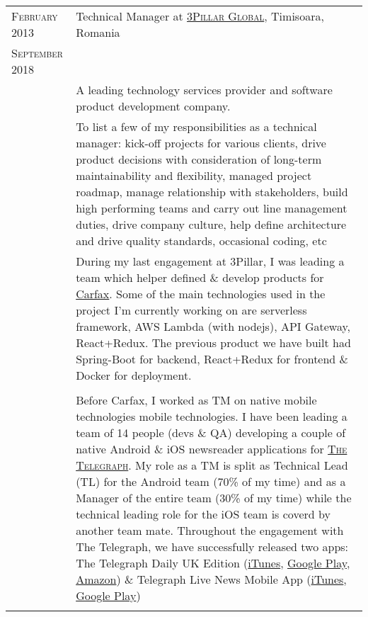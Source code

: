 \documentclass[a4paper,10pt]{article}
\begin{document}
\begin{longtable}{p{2.5cm}|p{11cm}}
 \raggedleft \textsc{February 2013} & Technical Manager at
 \textsc{\href{http://www.3pillarglobal.com/}{3Pillar Global}}, Timisoara, Romania
 \\\raggedleft \textsc{September 2018}\\ 
& \footnotesize{A leading technology services provider and software product development company.}\\
& \footnotesize{To list a few of my responsibilities as a technical manager: kick-off projects for various clients, drive product decisions with consideration of long-term maintainability and flexibility, managed project roadmap, manage relationship with stakeholders, build high performing teams and carry out line management duties, drive company culture, help define architecture and drive quality standards, occasional coding, etc}\\
& \footnotesize{During my last engagement at 3Pillar, I was leading a team which helper defined \& develop products for \href{https://www.carfax.com/}{Carfax}. Some of the main technologies used in the  project I'm currently working on are serverless framework, AWS Lambda (with nodejs), API Gateway, React+Redux. The previous product we have built had Spring-Boot for backend, React+Redux for frontend \& Docker for deployment.}\\ \\
& \footnotesize{Before Carfax, I worked as TM on native mobile technologies mobile technologies. I have been leading a team of 14 people (devs \& QA) developing a couple of native Android \& iOS newsreader applications for \textsc{\href{http://www.telegraph.co.uk/}{The Telegraph}}. My role as a TM is split as Technical Lead (TL) for the Android team (70\% of my time) and as a Manager of the entire team (30\% of  my time) while the technical leading role for the iOS team is coverd by another team mate. Throughout the engagement with The Telegraph, we have successfully released two apps: The Telegraph Daily UK Edition (\href{https://itunes.apple.com/gb/app/telegraph-daily-uk-edition/id388947468?mt=8}{iTunes}, \href{https://play.google.com/store/apps/details?id=uk.co.telegraph.kindlefire&hl=en}{Google Play}, \href{http://www.amazon.co.uk/The-Telegraph-Daily-UK-Edition/dp/B00DHIWONS}{Amazon}) \& Telegraph Live News Mobile App (\href{https://itunes.apple.com/us/app/telegraph-live-news-mobile/id303301873?mt=8}{iTunes}, \href{https://play.google.com/store/apps/details?id=uk.co.telegraph.android&hl=en}{Google Play})}\\ \\

\end{longtable}
\end{document}
